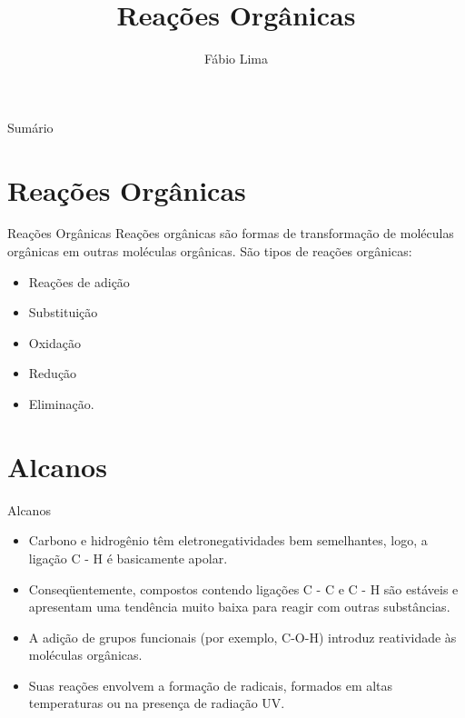 \documentclass[presentation,professionalfonts,aspectratio=169]{beamer}
\date{}
\author{Fábio Lima}
\date{}
\title{Reações Orgânicas}
\begin{document}
\begingroup
  \maketitle
  \endgroup
\begin{frame}{Sumário}
\tableofcontents
\end{frame}


\section{Reações Orgânicas}
\label{sec:org900f9ed}
\begin{frame}[label={sec:org502dc3f}]{Reações Orgânicas}
Reações orgânicas são formas de transformação de moléculas orgânicas em outras moléculas orgânicas. São tipos de reações orgânicas:
\begin{itemize}
\item Reações de adição
\item Substituição
\item Oxidação
\item Redução
\item Eliminação.
\end{itemize}
\end{frame}

\section{Alcanos}
\label{sec:org3b1a34e}

\begin{frame}[label={sec:org9525017}]{Alcanos}
\begin{itemize}
\item Carbono e hidrogênio têm eletronegatividades bem semelhantes, logo, a ligação C - H é basicamente apolar.
\item Conseqüentemente, compostos contendo ligações C - C e C - H são estáveis e apresentam uma tendência muito baixa para reagir com outras substâncias.
\item A adição de grupos funcionais (por exemplo, C-O-H) introduz reatividade às moléculas orgânicas.
\item Suas reações envolvem a formação de radicais, formados em altas temperaturas ou na presença de radiação UV.
\end{itemize}
\end{frame}
\end{document}
